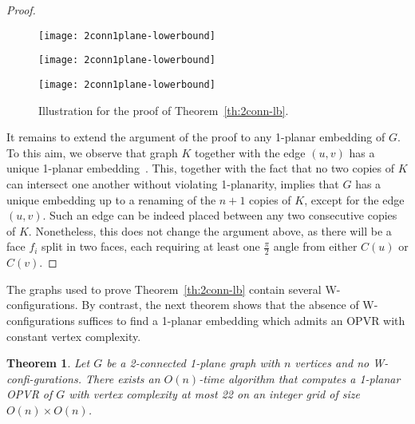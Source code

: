 \documentclass{article}
\newtheorem{theorem}{Theorem}
\newcommand{\ph}{\frac{\pi}{2}}
\newcommand{\opvr}{OPVR\xspace}
\begin{document}
\begin{proof}
\begin{figure}[t]
    \centering
    \begin{minipage}[b]{.31\textwidth}
    	\centering
    	\texttt{[image: 2conn1plane-lowerbound]}
    	\label{fi:2connlb-1}
    \end{minipage}
    \begin{minipage}[b]{.31\textwidth}
    	\centering
    	\texttt{[image: 2conn1plane-lowerbound]}
    	\label{fi:2connlb-2}
    \end{minipage}
    \begin{minipage}[b]{.31\textwidth}
    	\centering
    	\texttt{[image: 2conn1plane-lowerbound]}
    	\label{fi:2connlb-3}
    \end{minipage}
    \caption{ Illustration for the proof of Theorem~\ref{th:2conn-lb}.}
\end{figure}




It remains to extend the argument of the proof to any 1-planar embedding of $G$. To this aim, we observe that graph $K$ together with the edge $(u,v)$  has a unique 1-planar embedding~\cite{Suzuki2010}. This, together with the fact that no two copies of $K$ can intersect one another without violating 1-planarity, implies that $G$ has a unique embedding up to a renaming of the $n+1$ copies of $K$, except for the edge $(u,v)$. Such an edge can be indeed placed between any two consecutive copies of $K$. Nonetheless, this does not change the argument above, as there will be a face $f_i$ split in two faces, each requiring at least one $\ph$ angle from either $C(u)$ or $C(v)$.
\end{proof}


The graphs used to prove Theorem~\ref{th:2conn-lb} contain several W-configurations. By contrast, the next theorem shows that the absence of W-configurations suffices to find a 1-planar embedding which admits an \opvr with constant vertex complexity. 

\begin{theorem}\label{th:2conn1plane-ub}
Let $G$ be a 2-connected 1-plane graph with $n$ vertices and no W-confi-gurations. There exists an $O(n)$-time algorithm that computes a 1-planar \opvr of $G$ with vertex complexity at most 22 on an integer grid of size $O(n) \times O(n)$.
\end{theorem}
\end{document}
